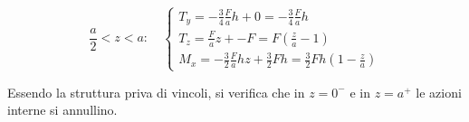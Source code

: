\begin{esempioBox}
\begin{itemize}
\begin{equation*}
    \frac{a}{2}<z<a: \quad 
    \begin{cases}
        T_y = -\frac{3}{4}\frac{F}{a}h + 0 = -\frac{3}{4}\frac{F}{a}h\\
        T_z = \frac{F}{a}z + -F = F(\frac{z}{a}-1) \\
        M_x = -\frac{3}{2}\frac{F}{a}hz + \frac{3}{2}Fh = \frac{3}{2}Fh\left(1 - \frac{z}{a}\right)
    \end{cases}
\end{equation*}
    \end{itemize}

Essendo la struttura priva di vincoli, si verifica che in $z=0^-$ e in $z=a^+$ le azioni interne si annullino.
    
\end{esempioBox}


